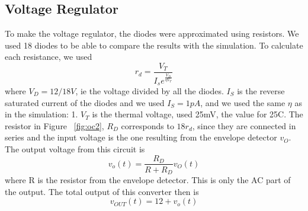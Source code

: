\subsection{Voltage Regulator}
To make the voltage regulator, the diodes were approximated using resistors. We used 18 diodes to be able to compare the results with the simulation. To calculate each resistance, we used 
\begin{equation}
 r_d=\frac{V_T}{I_se^{\frac{V_D}{\eta V_T}}}
\end{equation}
where $V_D=12/18 V$, ie the voltage divided by all the diodes. $I_S$ is the reverse saturated current of the diodes and we used $I_S=1 pA$, and we used the same $\eta$ as in the simulation: 1. $V_T$ is the thermal voltage, used 25mV, the value for 25\textdegree C. The resistor in Figure ~\ref{fig:oc2}, $R_D$ corresponds to $18r_d$, since they are connected in series and the input voltage is the one resulting from the envelope detector $v_O$.\\
The output voltage from this circuit is 
\begin{equation}
    v_o(t)=\frac{R_D}{R+R_D}v_O(t)
\end{equation}
where R is the resistor from the envelope detector.
This is only the AC part of the output.
The total output of this converter then is
\begin{equation}
    v_{OUT}(t)=12+v_o(t)
\end{equation}